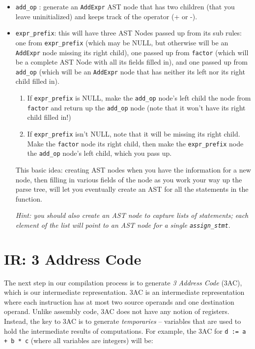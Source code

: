 \documentclass{article}
\begin{document}
\begin{itemize}
	\item \texttt{add\_op} : generate an \texttt{AddExpr} AST node that has two children (that you leave uninitialized) and keeps track of the operator (+ or -).
	\item \texttt{expr\_prefix}: this will have three AST Nodes passed up from its sub rules: one from \texttt{expr\_prefix} (which may be NULL, but otherwise will be an \texttt{AddExpr} node missing its right child), one passed up from \texttt{factor} (which will be a complete AST Node with all its fields filled in), and one passed up from \texttt{add\_op} (which will be an \texttt{AddExpr} node that has neither its left nor its right child filled in). 
		\begin{enumerate}
			\item If \texttt{expr\_prefix} is NULL, make the \texttt{add\_op} node's left child the node from \texttt{factor} and return up the \texttt{add\_op} node (note that it won't have its right child filled in!)
			\item If \texttt{expr\_prefix} isn't NULL, note that it will be missing its right child. Make the \texttt{factor} node its right child, then make the \texttt{expr\_prefix} node the \texttt{add\_op} node's left child, which you pass up.
		\end{enumerate}

		This basic idea: creating AST nodes when you have the information for a new node, then filling in various fields of the node as you work your way up the parse tree, will let you eventually create an AST for all the statements in the function. 

		{\em Hint: you should also create an AST node to capture lists of statements; each element of the list will point to an AST node for a single \texttt{assign\_stmt}}.
\end{itemize}

\section{IR: 3 Address Code}
The next step in our compilation process is to generate {\em 3 Address Code} (3AC), which is our intermediate representation. 3AC is an intermediate representation where each instruction has at most two source operands and one destination operand. Unlike assembly code, 3AC does not have any notion of registers. Instead, the key to 3AC is to generate {\em temporaries} -- variables that are used to hold the intermediate results of computations. For example, the 3AC for \texttt{d := a + b * c} (where all variables are integers) will be:
\end{document}
